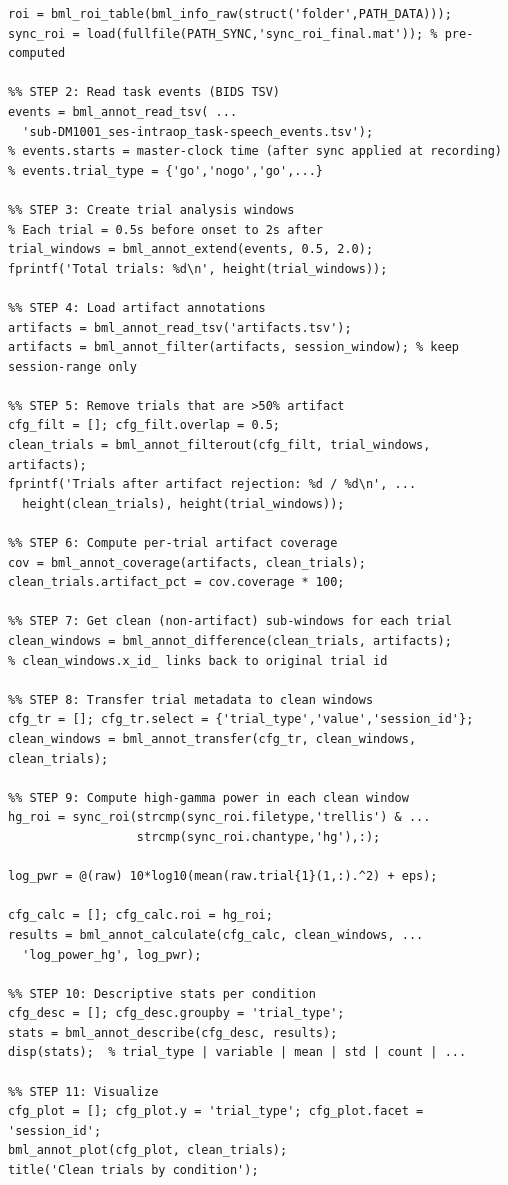 \documentclass[11pt, a4paper]{article}
\begin{document}
\begin{lstlisting}[style=matlab, caption={Complete pipeline: raw events to trial features}]
%% STEP 1: Load session ROI and build sync
roi = bml_roi_table(bml_info_raw(struct('folder',PATH_DATA)));
sync_roi = load(fullfile(PATH_SYNC,'sync_roi_final.mat')); % pre-computed

%% STEP 2: Read task events (BIDS TSV)
events = bml_annot_read_tsv( ...
  'sub-DM1001_ses-intraop_task-speech_events.tsv');
% events.starts = master-clock time (after sync applied at recording)
% events.trial_type = {'go','nogo','go',...}

%% STEP 3: Create trial analysis windows
% Each trial = 0.5s before onset to 2s after
trial_windows = bml_annot_extend(events, 0.5, 2.0);
fprintf('Total trials: %d\n', height(trial_windows));

%% STEP 4: Load artifact annotations
artifacts = bml_annot_read_tsv('artifacts.tsv');
artifacts = bml_annot_filter(artifacts, session_window); % keep session-range only

%% STEP 5: Remove trials that are >50% artifact
cfg_filt = []; cfg_filt.overlap = 0.5;
clean_trials = bml_annot_filterout(cfg_filt, trial_windows, artifacts);
fprintf('Trials after artifact rejection: %d / %d\n', ...
  height(clean_trials), height(trial_windows));

%% STEP 6: Compute per-trial artifact coverage
cov = bml_annot_coverage(artifacts, clean_trials);
clean_trials.artifact_pct = cov.coverage * 100;

%% STEP 7: Get clean (non-artifact) sub-windows for each trial
clean_windows = bml_annot_difference(clean_trials, artifacts);
% clean_windows.x_id_ links back to original trial id

%% STEP 8: Transfer trial metadata to clean windows
cfg_tr = []; cfg_tr.select = {'trial_type','value','session_id'};
clean_windows = bml_annot_transfer(cfg_tr, clean_windows, clean_trials);

%% STEP 9: Compute high-gamma power in each clean window
hg_roi = sync_roi(strcmp(sync_roi.filetype,'trellis') & ...
                  strcmp(sync_roi.chantype,'hg'),:);

log_pwr = @(raw) 10*log10(mean(raw.trial{1}(1,:).^2) + eps);

cfg_calc = []; cfg_calc.roi = hg_roi;
results = bml_annot_calculate(cfg_calc, clean_windows, ...
  'log_power_hg', log_pwr);

%% STEP 10: Descriptive stats per condition
cfg_desc = []; cfg_desc.groupby = 'trial_type';
stats = bml_annot_describe(cfg_desc, results);
disp(stats);  % trial_type | variable | mean | std | count | ...

%% STEP 11: Visualize
cfg_plot = []; cfg_plot.y = 'trial_type'; cfg_plot.facet = 'session_id';
bml_annot_plot(cfg_plot, clean_trials);
title('Clean trials by condition');
\end{lstlisting}
\end{document}
